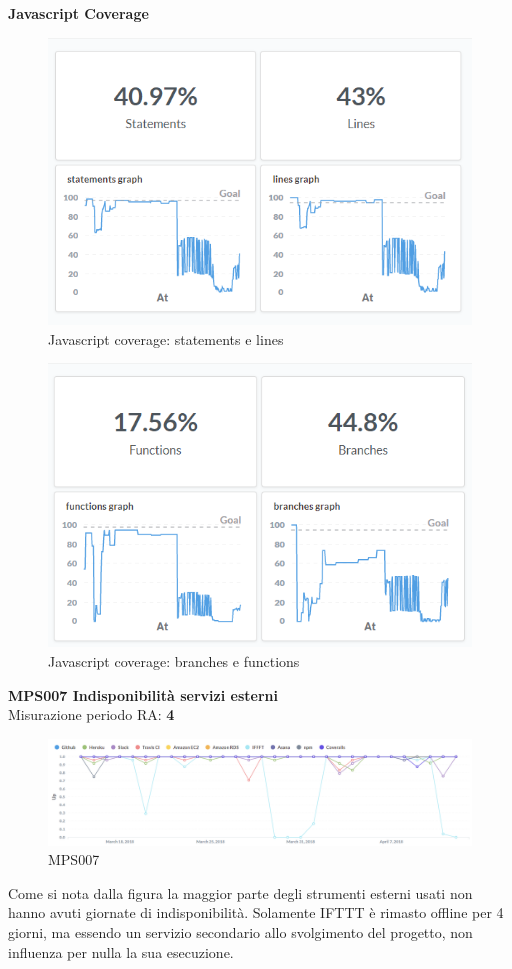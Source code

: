 \documentclass[PianoDiQualifica.tex]{subfiles}
\begin{document}
\textbf{Javascript Coverage}\\
\begin{figure}[H]
	\centering
	\includegraphics[width=0.7\linewidth]{RQ/JsCoverage1}
	\caption{Javascript coverage: statements e lines}
	\label{fig:processi}
\end{figure}
\begin{figure}[H]
	\centering
	\includegraphics[width=0.7\linewidth]{RQ/JsCoverage2}
	\caption{Javascript coverage: branches e functions}
	\label{fig:processi}
\end{figure}
\newpage
\textbf{MPS007 Indisponibilità servizi esterni}\\
Misurazione periodo RA: \textbf{4}
\begin{figure}[H]
	\centering
	\includegraphics[width=1\linewidth]{RQ/MPS007}
	\caption{MPS007}
	\label{fig:processi}
\end{figure}
Come si nota dalla figura la maggior parte degli strumenti esterni usati non hanno avuti giornate di indisponibilità.
Solamente IFTTT è rimasto offline per 4 giorni, ma essendo un servizio secondario allo svolgimento del progetto, non influenza per nulla la sua esecuzione. \\
\end{document}
